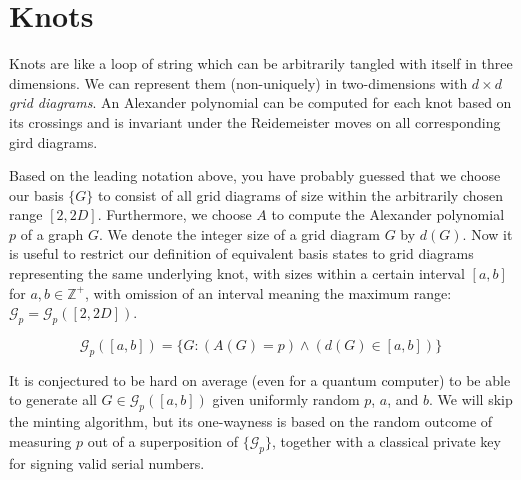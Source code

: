 \section{Knots}

Knots are like a loop of string which can be arbitrarily tangled
with
itself in three dimensions. We
can represent them (non-uniquely) in two-dimensions with $d \times d$
\emph{grid diagrams}.
An Alexander polynomial can be computed for each knot based on its
crossings and is invariant under the Reidemeister moves on all
corresponding gird diagrams.

Based on the leading notation above, you have probably guessed that we
choose our basis $\{G\}$ to consist of all grid diagrams of size
within the arbitrarily chosen range
$[2,2D]$.
Furthermore, we choose $A$ to compute
the Alexander polynomial $p$ of a graph $G$.
We denote the integer size of a grid diagram $G$ by $d(G)$.
Now it is useful to restrict our definition of equivalent basis states
to grid diagrams representing the same underlying knot,
with sizes within a certain interval $[a,b]$ for $a,b \in \mathbb{Z}^+$,
with omission of an interval meaning the
maximum range: $\mathcal{G}_p = \mathcal{G}_p([2,2D])$.

\begin{displaymath}
\mathcal{G}_p([a,b]) = \{G: (A(G) = p) \land (d(G) \in[a,b]) \}
\end{displaymath}

It is conjectured to be hard on average (even for a quantum computer)
to be able to generate all $G \in \mathcal{G}_p([a,b])$ given
uniformly random $p$, $a$, and $b$. We will skip the minting algorithm,
but its one-wayness is based on the random outcome of measuring $p$
out of a superposition of $\{\mathcal{G}_p\}$, together with a classical
private key for signing valid serial numbers.


